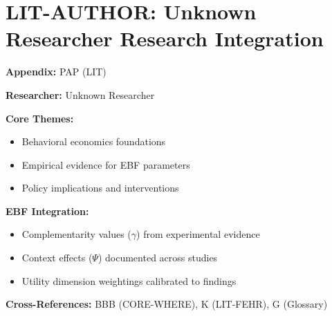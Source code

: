 %
%

\chapter{LIT-AUTHOR: Unknown Researcher Research Integration}
\label{app:pap}

\begin{abstract}
This appendix integrates the research contributions of Unknown Researcher into the
Evidence-Based Framework. It documents key papers, core findings, and their
integration with EBF dimensions including complementarity parameters ($\gamma$),
context factors ($\Psi$), and utility dimensions.
\end{abstract}

\begin{tcolorbox}[colback=blue!5!white, colframe=blue!75!black,
    title=Quick Reference: Unknown Researcher Research]

\textbf{Appendix:} PAP (LIT)

\textbf{Researcher:} Unknown Researcher

\textbf{Core Themes:}
\begin{itemize}[nosep]
\item Behavioral economics foundations
\item Empirical evidence for EBF parameters
\item Policy implications and interventions
\end{itemize}

\textbf{EBF Integration:}
\begin{itemize}[nosep]
\item Complementarity values ($\gamma$) from experimental evidence
\item Context effects ($\Psi$) documented across studies
\item Utility dimension weightings calibrated to findings
\end{itemize}

\textbf{Cross-References:} BBB (CORE-WHERE), K (LIT-FEHR), G (Glossary)
\end{tcolorbox}

